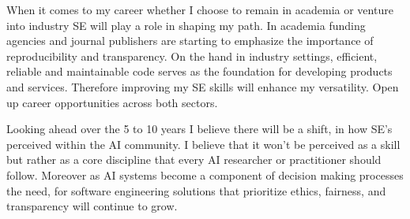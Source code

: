 \documentclass[11pt,a4paper]{article}
\begin{document}
When it comes to my career whether I choose to remain in academia or venture into industry SE will play a role in shaping my path. In academia funding agencies and journal publishers are starting to emphasize the importance of reproducibility and transparency. On the hand in industry settings, efficient, reliable and maintainable code serves as the foundation for developing products and services. Therefore improving my SE skills will enhance my versatility. Open up career opportunities across both sectors.

Looking ahead over the 5 to 10 years I believe there will be a shift, in how SE's perceived within the AI community.
I believe that it won't be perceived as a skill but rather as a core discipline that every AI researcher or practitioner should follow. Moreover as AI systems become a component of decision making processes the need, for software engineering solutions that prioritize ethics, fairness, and transparency will continue to grow.
\end{document}
